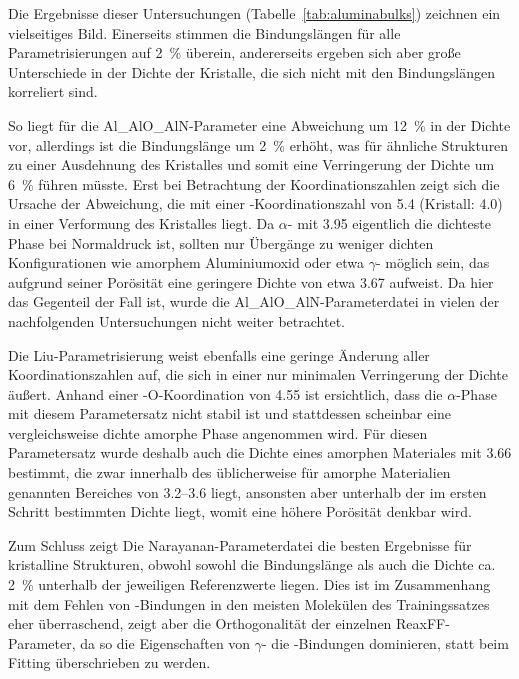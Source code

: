 Die Ergebnisse dieser Untersuchungen (Tabelle~\ref{tab:aluminabulks}) zeichnen ein vielseitiges Bild.
Einerseits stimmen die Bindungslängen für alle Parametrisierungen auf \SI{2}{\percent} überein, andererseits ergeben sich aber große Unterschiede in der Dichte der Kristalle, die sich nicht mit den Bindungslängen korreliert sind.

So liegt für die Al\_AlO\_AlN-Parameter eine Abweichung um \SI{+12}{\percent} in der Dichte vor, allerdings ist die Bindungslänge um \SI{2}{\percent} erhöht, was für ähnliche Strukturen zu einer Ausdehnung des Kristalles und somit eine Verringerung der Dichte um \SI{6}{\percent} führen müsste.
Erst bei Betrachtung der Koordinationszahlen zeigt sich die Ursache der Abweichung, die mit einer -Koordinationszahl von \num{5.4} (Kristall: \num{4.0}) in einer Verformung des Kristalles liegt.
Da $\alpha$- mit \SI{3.95}{\gpcc} eigentlich die dichteste Phase bei Normaldruck ist, sollten nur Übergänge zu weniger dichten Konfigurationen wie amorphem Aluminiumoxid oder etwa $\gamma$- möglich sein, das aufgrund seiner Porösität eine geringere Dichte von etwa \SI{3.67}{\gpcc}\cite{dynys_alpha_1982} aufweist.
Da hier das Gegenteil der Fall ist, wurde die Al\_AlO\_AlN-Parameterdatei in vielen der nachfolgenden Untersuchungen nicht weiter betrachtet.

Die Liu-Parametrisierung weist ebenfalls eine geringe Änderung aller Koordinationszahlen auf, die sich in einer nur minimalen Verringerung der Dichte äußert.
Anhand einer -{O}-Koordination von \num{4.55} ist ersichtlich, dass die $\alpha$-Phase mit diesem Parametersatz nicht stabil ist und stattdessen scheinbar eine vergleichsweise dichte amorphe Phase angenommen wird.
Für diesen Parametersatz wurde deshalb auch die Dichte eines amorphen Materiales mit \SI{3.66}{\gpcc} bestimmt, die zwar innerhalb des üblicherweise für amorphe Materialien genannten Bereiches von \SIrange{3.2}{3.6}{\gpcc} liegt, ansonsten aber unterhalb der im ersten Schritt bestimmten Dichte liegt, womit eine höhere Porösität denkbar wird.

Zum Schluss zeigt Die Narayanan-Parameterdatei die besten Ergebnisse für kristalline Strukturen, obwohl sowohl die Bindungslänge als auch die Dichte ca. \SI{2}{\percent} unterhalb der jeweiligen Referenzwerte liegen.
Dies ist im Zusammenhang mit dem Fehlen von -Bindungen in den meisten Molekülen des Trainingssatzes eher überraschend, zeigt aber die Orthogonalität der einzelnen ReaxFF-Parameter, da so die Eigenschaften von $\gamma$- die -Bindungen dominieren, statt beim Fitting überschrieben zu werden.

